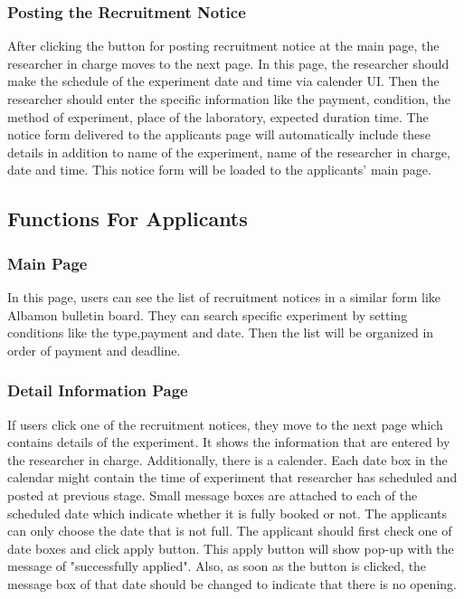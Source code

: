 \documentclass[letterpaper, 10 pt, conference]{ieeeconf}  %
\begin{document}
\subsubsection{Posting the Recruitment Notice}
After clicking the button for posting recruitment notice at the main page, the researcher in charge moves to the next page. In this page, the researcher should make the schedule of the experiment date and time via calender UI. Then the researcher should enter the specific information like the payment, condition, the method of experiment, place of the laboratory, expected duration time. The notice form delivered to the applicants page will automatically include these details in addition to name of the experiment, name of the researcher in charge, date and time. This notice form will be loaded to the applicants' main page.

\subsection{Functions For Applicants}
\subsubsection{Main Page}
In this page, users can see the list of recruitment notices in a similar form like Albamon bulletin board. They can search specific experiment by setting conditions like the type,payment and date. Then the list will be organized in order of payment and deadline.
\subsubsection{Detail Information Page}
If users click one of the recruitment notices, they move to the next page which contains details of the experiment. It shows the information that are entered by the researcher in charge. Additionally, there is a calender. Each date box in the calendar might contain the time of experiment that researcher has scheduled and posted at previous stage. Small message boxes are attached to each of the scheduled date which indicate whether it is fully booked or not.  The applicants can only choose the date that is not full. The applicant should first check one of date boxes and click apply button. This apply button will show pop-up with the message of "successfully applied". Also, as soon as the button is clicked, the message box of that date should be changed to indicate that there is no opening. 
\end{document}
